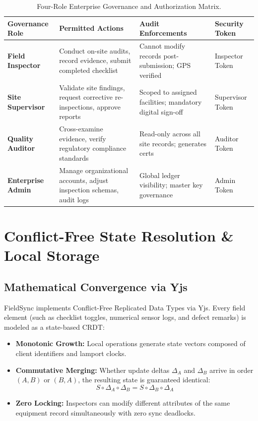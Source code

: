 \documentclass[12pt,a4paper]{report}
\begin{document}
\begin{table}[htbp]
\centering
\small
\begin{tabularx}{\linewidth}{>{\raggedright\arraybackslash\bfseries}p{2.1cm}>{\raggedright\arraybackslash}X>{\raggedright\arraybackslash}X>{\raggedright\arraybackslash}p{1.9cm}}
\toprule
Governance Role & Permitted Actions & Audit Enforcements & Security Token \\
\midrule
Field Inspector & Conduct on-site audits, record evidence, submit completed checklist & Cannot modify records post-submission; GPS verified & Inspector Token \\
\addlinespace
Site Supervisor & Validate site findings, request corrective re-inspections, approve reports & Scoped to assigned facilities; mandatory digital sign-off & Supervisor Token \\
\addlinespace
Quality Auditor & Cross-examine evidence, verify regulatory compliance standards & Read-only across all site records; generates certs & Auditor Token \\
\addlinespace
Enterprise Admin & Manage organizational accounts, adjust inspection schemas, audit logs & Global ledger visibility; master key governance & Admin Token \\
\bottomrule
\end{tabularx}
\caption{Four-Role Enterprise Governance and Authorization Matrix.}
\label{tab:fieldsync_rbac}
\end{table}

\chapter{Conflict-Free State Resolution \& Local Storage}

\section{Mathematical Convergence via Yjs}
FieldSync implements Conflict-Free Replicated Data Types via Yjs. Every field element (such as checklist toggles, numerical sensor logs, and defect remarks) is modeled as a state-based CRDT:
\begin{itemize}[nosep]
    \item \textbf{Monotonic Growth:} Local operations generate state vectors composed of client identifiers and lamport clocks.
    \item \textbf{Commutative Merging:} Whether update deltas $\Delta_A$ and $\Delta_B$ arrive in order $(A, B)$ or $(B, A)$, the resulting state is guaranteed identical:
    \begin{equation}
    S \circ \Delta_A \circ \Delta_B = S \circ \Delta_B \circ \Delta_A
    \end{equation}
    \item \textbf{Zero Locking:} Inspectors can modify different attributes of the same equipment record simultaneously with zero sync deadlocks.
\end{itemize}
\end{document}
